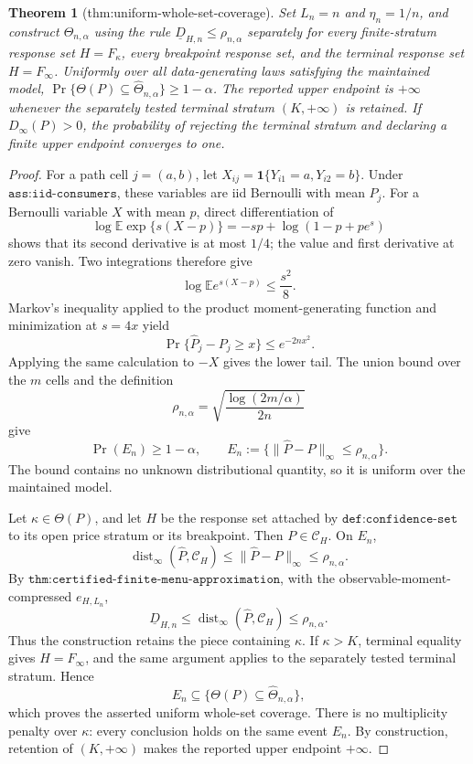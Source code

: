 \documentclass{article}
\newtheorem{theorem}{Theorem}
\begin{document}
\begin{theorem}[thm:uniform-whole-set-coverage]\label{thm:uniform-whole-set-coverage}
Set \(L_n=n\) and \(\eta_n=1/n\), and construct \(\widehat\Theta_{n,\alpha}\) using the rule \(\underline D_{H,n}\le\rho_{n,\alpha}\) separately for every finite-stratum response set \(H=F_\kappa\), every breakpoint response set, and the terminal response set \(H=F_\infty\). Uniformly over all data-generating laws satisfying the maintained model, \(\Pr\{\Theta(P)\subseteq\widehat\Theta_{n,\alpha}\}\ge1-\alpha\). The reported upper endpoint is \(+\infty\) whenever the separately tested terminal stratum \((K,+\infty)\) is retained. If \(D_\infty(P)>0\), the probability of rejecting the terminal stratum and declaring a finite upper endpoint converges to one.
\end{theorem}
\begin{proof}
For a path cell \(j=(a,b)\), let \(X_{ij}=\mathbf 1\{Y_{i1}=a,Y_{i2}=b\}\).  Under \(\texttt{ass:iid-consumers}\), these variables are iid Bernoulli with mean \(P_j\).  For a Bernoulli variable \(X\) with mean \(p\), direct differentiation of
\[
 \log\mathbb E\exp\{s(X-p)\}=-sp+\log(1-p+pe^s)
\]
shows that its second derivative is at most \(1/4\); the value and first derivative at zero vanish.  Two integrations therefore give
\[
 \log\mathbb E e^{s(X-p)}\le\frac{s^2}{8}.
\]
Markov's inequality applied to the product moment-generating function and minimization at \(s=4x\) yield
\[
 \Pr\{\widehat P_j-P_j\ge x\}\le e^{-2nx^2}.
\]
Applying the same calculation to \(-X\) gives the lower tail.  The union bound over the \(m\) cells and the definition
\[
 \rho_{n,\alpha}=\sqrt{\frac{\log(2m/\alpha)}{2n}}
\]
give
\[
 \Pr(E_n)\ge1-\alpha,
 \qquad
 E_n:=\{\|\widehat P-P\|_\infty\le\rho_{n,\alpha}\}.
\]
The bound contains no unknown distributional quantity, so it is uniform over the maintained model.

Let \(\kappa\in\Theta(P)\), and let \(H\) be the response set attached by \(\texttt{def:confidence-set}\) to its open price stratum or its breakpoint.  Then \(P\in\mathcal C_H\).  On \(E_n\),
\[
 \operatorname{dist}_\infty(\widehat P,\mathcal C_H)
 \le\|\widehat P-P\|_\infty
 \le\rho_{n,\alpha}.
\]
By \(\texttt{thm:certified-finite-menu-approximation}\), with the observable-moment-compressed \(e_{H,L_n}\),
\[
 \underline D_{H,n}
 \le\operatorname{dist}_\infty(\widehat P,\mathcal C_H)
 \le\rho_{n,\alpha}.
\]
Thus the construction retains the piece containing \(\kappa\).  If \(\kappa>K\), terminal equality gives \(H=F_\infty\), and the same argument applies to the separately tested terminal stratum.  Hence
\[
 E_n\subseteq\{\Theta(P)\subseteq\widehat\Theta_{n,\alpha}\},
\]
which proves the asserted uniform whole-set coverage.  There is no multiplicity penalty over \(\kappa\): every conclusion holds on the same event \(E_n\).  By construction, retention of \((K,+\infty)\) makes the reported upper endpoint \(+\infty\).


\end{proof}
\end{document}
